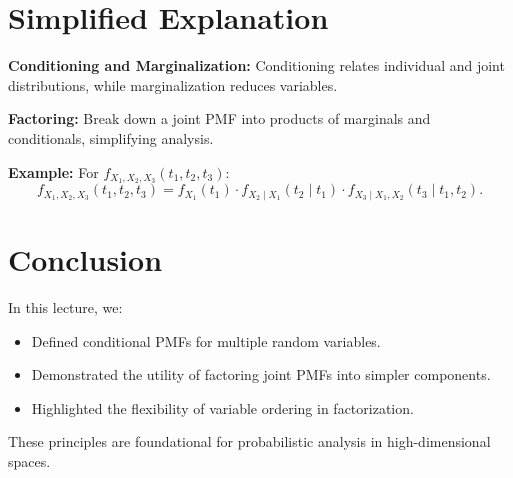 \documentclass{article}
\begin{document}
\section*{Simplified Explanation}

\textbf{Conditioning and Marginalization:}
Conditioning relates individual and joint distributions, while marginalization reduces variables.

\textbf{Factoring:}
Break down a joint PMF into products of marginals and conditionals, simplifying analysis.

\textbf{Example:}
For $f_{X_1, X_2, X_3}(t_1, t_2, t_3)$:
\[
  f_{X_1, X_2, X_3}(t_1, t_2, t_3) = f_{X_1}(t_1) \cdot f_{X_2 \mid X_1}(t_2 \mid t_1) \cdot f_{X_3 \mid X_1, X_2}(t_3 \mid t_1, t_2).
\]

\section*{Conclusion}

In this lecture, we:
\begin{itemize}
  \item Defined conditional PMFs for multiple random variables.
  \item Demonstrated the utility of factoring joint PMFs into simpler components.
  \item Highlighted the flexibility of variable ordering in factorization.
\end{itemize}

These principles are foundational for probabilistic analysis in high-dimensional spaces.
\end{document}
